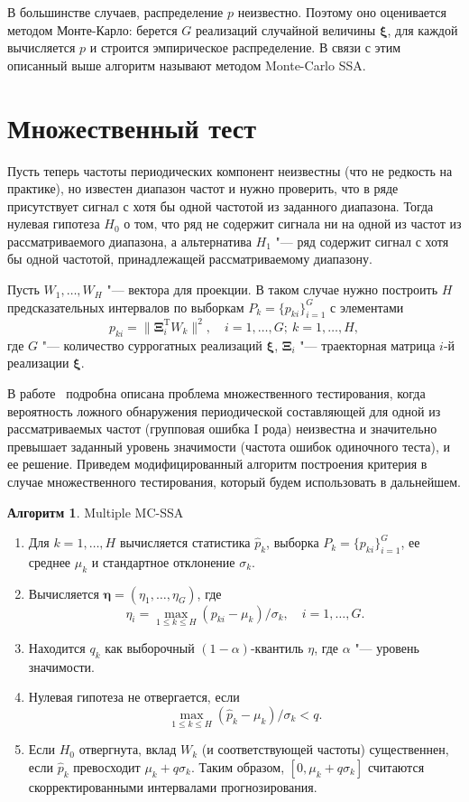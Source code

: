 \documentclass[specialist,
substylefile = spbu_report.rtx,
subf,href,colorlinks=true, 12pt]{disser}
\newcommand{\transponse}{^\mathrm{T}}
\theoremstyle{definition}
\newtheorem{algorithm}{Алгоритм}
\begin{document}
	В большинстве случаев, распределение $p$ неизвестно. Поэтому оно оценивается методом Монте-Карло: берется $G$ реализаций случайной величины $\boldsymbol\xi$, для каждой вычисляется $p$ и строится эмпирическое распределение. В связи с этим описанный выше алгоритм называют методом Monte-Carlo SSA. 
	\section{Множественный тест}
	Пусть теперь частоты периодических компонент неизвестны (что не редкость на практике), но известен диапазон частот и нужно проверить, что в ряде присутствует сигнал с хотя бы одной частотой из заданного диапазона. Тогда нулевая гипотеза $H_0$ о том, что ряд не содержит сигнала ни на одной из частот из рассматриваемого диапазона, а альтернатива $H_1$ "--- ряд содержит сигнал с хотя бы одной частотой, принадлежащей рассматриваемому диапазону.
	
	Пусть $W_1,\ldots,W_H$ "--- вектора для проекции. В таком случае нужно построить $H$ предсказательных интервалов по выборкам $P_k=\{p_{ki}\}_{i=1}^G$ с элементами
	\begin{equation}
		p_{ki}=\|\mathbf{\Xi}_i\transponse W_k\|^2,\quad i=1,\ldots,G;\ k=1,\ldots,H,
	\end{equation}
	где $G$ "--- количество суррогатных реализаций $\boldsymbol{\xi}$, $\mathbf{\Xi}_i$ "--- траекторная матрица $i$-й реализации $\boldsymbol{\xi}$. 
	
	В работе~\cite{Golyandina_2023} подробна описана проблема множественного тестирования, когда вероятность ложного обнаружения периодической составляющей для одной из рассматриваемых частот (групповая ошибка I рода) неизвестна и значительно превышает заданный уровень значимости (частота ошибок одиночного теста), и ее решение. Приведем модифицированный алгоритм построения критерия в случае множественного тестирования, который будем использовать в дальнейшем.
	\begin{algorithm}{Multiple MC-SSA~\cite{Golyandina_2023}}
	\begin{enumerate}
		\item Для $k=1,\dots,H$ вычисляется статистика $\widehat{p}_k$, выборка $P_k=\{p_{ki}\}_{i=1}^G$, ее среднее $\mu_k$ и стандартное отклонение $\sigma_k$.
		\item Вычисляется $\mathbf{\eta}=(\eta_1,\dots,\eta_G)$, где
		\[
		\eta_i=\max_{1\leqslant k\leqslant H}(p_{ki}-\mu_k)/\sigma_k,\quad i=1,\dots,G.
		\]
		\item Находится $q_k$ как выборочный $(1-\alpha)$-квантиль $\eta$, где $\alpha$ "--- уровень значимости.
		\item Нулевая гипотеза не отвергается, если
		\[
		\max_{1\leqslant k\leqslant H}(\widehat{p}_k-\mu_k)/\sigma_k<q.
		\]
		\item Если $H_0$ отвергнута, вклад $W_k$ (и соответствующей частоты) существеннен, если $\widehat{p}_k$ превосходит $\mu_k+q\sigma_k$. Таким образом, $[0,\mu_k+q\sigma_k]$ считаются скорректированными интервалами прогнозирования.
	\end{enumerate}
	\end{algorithm}
\end{document}
